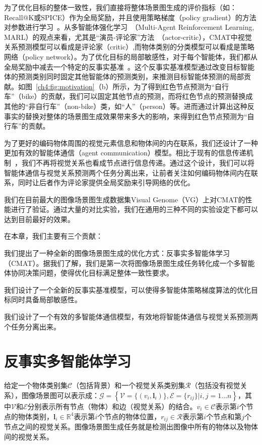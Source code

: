 为了优化目标的整体一致性，我们直接将整体场景图生成的评价指标（如：Recall@K或SPICE）作为全局奖励，并且使用策略梯度（policy gradient）的方法对参数进行学习~\cite{sutton2000policy}。从多智能体强化学习~\cite{tampuu2017multiagent,lowe2017multi}（Multi-Agent Reinforcement Learning, MARL）的观点来看，尤其是“演员-评论家”方法~\cite{lowe2017multi}（actor-critic），CMAT中视觉关系预测模型可以看成是评论家（critic）,而物体类别的分类模型可以看成是策略网络（policy network）。为了优化目标的局部敏感性，对于每个智能体，我们都从全局奖励中减去一个特定的反事实基准~\cite{foerster2018counterfactual}。这个反事实基准模型通过改变目标智能体的预测类别同时固定其他智能体的预测类别，来推测目标智能体预测的局部贡献。如图~\ref{ch4:fig:motivation}（b）所示，为了得到红色节点预测为“自行车”（bike）的贡献，我们可以固定其他节点的预测，而将红色节点的预测替换成其他的“非自行车”（non-bike）类，如“人”（person）等。进而通过计算出这种反事实的替换对整体的场景图生成效果带来多大的影响，来得到红色节点预测为“自行车”的贡献。

为了更好的编码物体周围的视觉元素信息和物体间的内在联系，我们还设计了一种更加有效的智能体通信（agent communication）模型。相比于现有的信息传递机制~\cite{xu2017scene, li2017scene, jae2018tensorize, li2017vip, yin2018zoom, li2018factorizable}，我们不再将视觉关系也看成节点进行信息传递。通过这个设计，我们可以将智能体通信与视觉关系预测两个任务分离出来，让前者关注如何编码物体间内在联系，同时让后者作为评论家提供全局奖励来引导网络的优化。

我们在目前最大的图像场景图生成数据集Visual Genome（VG）上对CMAT的性能进行了验证。通过大量的对比实验，我们在通用的三种不同的实验设定下都可以达到目前最好的效果。

在本章，我们主要有三个贡献：
\begin{asparaenum}
\item 我们提出了一种全新的图像场景图生成的优化方式：反事实多智能体学习（CMAT）。据我们了解，我们是第一次将图像场景图生成任务转化成一个多智能体协同决策问题，使得优化目标满足整体一致性要求。

\item 我们设计了一个全新的反事实基准模型，可以使得多智能体策略梯度算法的优化目标同时具备局部敏感性。

\item 我们设计了一个有效的多智能体通信模型，有效地将智能体通信与视觉关系预测两个任务分离出来。
\end{asparaenum}


\section{反事实多智能体学习}
给定一个物体类别集$\mathcal{C}$（包括背景）和一个视觉关系类别集$\mathcal{R}$（包括没有视觉关系），图像场景图可以表示成：$\mathcal{G} = \left\{ \mathcal{V}=\{(v_i, \bm{l}_i)\},\mathcal{E}=\{r_{ij}\} | i,j = 1...n \right\}$，其中$\mathcal{V}$和$\mathcal{E}$分别表示所有节点（物体）和边（视觉关系）的结合。$v_i \in \mathcal{C}$表示第$i$个节点的物体类别，$\bm{l}_i \in \mathbb{R}^4$表示第$i$个节点的物体位置，$r_{ij} \in \mathcal{R}$表示第$i$个节点和第$j$个节点之间的视觉关系。图像场景图生成任务就是检测出图像中所有的物体以及物体间的视觉关系。

